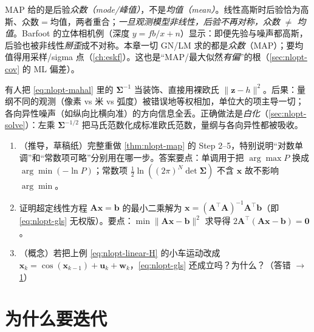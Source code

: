 \begin{pitfall}
MAP 给的是后验\emph{众数（mode/峰值）}，不是\emph{均值（mean）}。线性高斯时后验恰为高斯、众数$=$均值，两者重合；\emph{一旦观测模型非线性，后验不再对称，众数 $\neq$ 均值}\cite{barfoot2024state}。Barfoot 的立体相机例（深度 $y=fb/x+n$）显示：即便先验与噪声都高斯，后验也被非线性\emph{掰歪}成不对称。本章一切 GN/LM 求的都是\emph{众数}（MAP）；要均值得用采样/sigma 点（\cref{ch:eskf}）。这也是“MAP/最大似然\emph{有偏}”的根（\cref{sec:nlopt-cov} 的 ML 偏差）。
\end{pitfall}

\begin{pitfall}
有人把 \cref{eq:nlopt-mahal} 里的 $\boldsymbol{\Sigma}^{-1}$ 当装饰、直接用裸欧氏 $\|\mathbf{z}-h\|^2$。后果：量纲不同的观测（像素 vs 米 vs 弧度）被错误地等权相加，单位大的项主导一切；各向异性噪声（如纵向比横向准）的方向信息全丢。正确做法是\emph{白化}（\cref{sec:nlopt-solve}）：左乘 $\boldsymbol{\Sigma}^{-1/2}$ 把马氏范数化成标准欧氏范数，量纲与各向异性都被吸收。
\end{pitfall}

\begin{practice}
\begin{enumerate}
  \item （推导，草稿纸）完整重做 \cref{thm:nlopt-map} 的 Step 2--5，特别说明“对数单调”和“常数项可略”分别用在哪一步。答案要点：单调用于把 $\arg\max P$ 换成 $\arg\min(-\ln P)$；常数项 $\tfrac12\ln((2\pi)^N\det\boldsymbol{\Sigma})$ 不含 $\mathbf{x}$ 故不影响 $\arg\min$。
  \item 证明超定线性方程 $\mathbf{A}\mathbf{x}=\mathbf{b}$ 的最小二乘解为 $\mathbf{x}=(\mathbf{A}^\top\mathbf{A})^{-1}\mathbf{A}^\top\mathbf{b}$（即 \cref{eq:nlopt-gls} 无权版）。要点：$\min\|\mathbf{A}\mathbf{x}-\mathbf{b}\|^2$ 求导得 $2\mathbf{A}^\top(\mathbf{A}\mathbf{x}-\mathbf{b})=\mathbf{0}$。
  \item （概念）若把上例 \cref{eq:nlopt-linear-H} 的小车运动改成 $\mathbf{x}_k=\cos(\mathbf{x}_{k-1})+\mathbf{u}_k+\mathbf{w}_k$，\cref{eq:nlopt-gls} 还成立吗？为什么？（答错 $\to$ \cref{sec:nlopt-why}）
\end{enumerate}
\end{practice}

\section{为什么要迭代}
\label{sec:nlopt-why}

